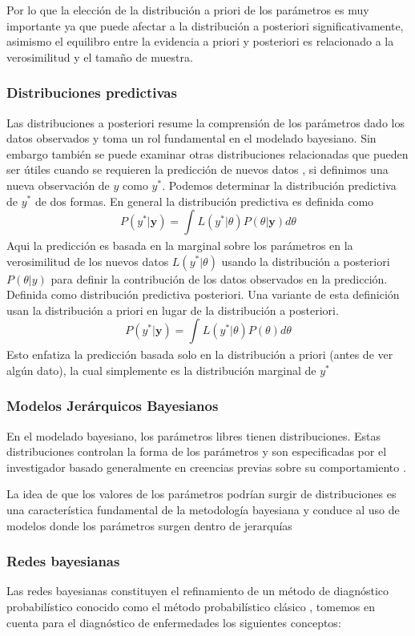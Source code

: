 Por lo que la elección de la distribución a priori de los parámetros es muy importante ya que puede afectar a la distribución a posteriori significativamente, asimismo el equilibro entre la evidencia a priori y posteriori es relacionado a la verosimilitud y el tamaño de muestra.

\subsubsection{Distribuciones predictivas}
Las distribuciones a posteriori resume la comprensión de los parámetros dado los datos observados y toma un rol fundamental en el modelado bayesiano. Sin embargo también se puede examinar otras distribuciones relacionadas que pueden ser útiles cuando se requieren la predicción de nuevos datos \cite{lawson2018bayesian}, si definimos una nueva observación de $y$ como $y^*$. Podemos determinar la distribución predictiva de $y^*$ de dos formas. En general la distribución predictiva es definida como
$$
P(y^* | \mathbf{y}) = \int_{}^{} L(y^* | \theta)P(\theta | \mathbf{y})d\theta
$$
Aqui la predicción es basada en la marginal sobre los parámetros en la verosimilitud de los nuevos datos $L(y^* | \theta)$ usando la distribución a posteriori $P(\theta | y)$ para definir la contribución de los datos observados en la predicción. Definida como distribución predictiva posteriori. Una variante de esta definición usan la distribución a priori en lugar de la distribución a posteriori.
$$
P(y^* | \mathbf{y}) = \int_{}^{} L(y^* | \theta)P(\theta)d\theta
$$
Esto enfatiza la predicción basada solo en la distribución a priori (antes de ver algún dato), la cual simplemente es la distribución marginal de $y^*$

\subsubsection{Modelos Jerárquicos Bayesianos}
En el modelado bayesiano, los parámetros libres tienen distribuciones. Estas distribuciones controlan la forma de los parámetros y son especificadas por el investigador basado generalmente en creencias previas sobre su comportamiento \cite{lawson2018bayesian}. 

La idea de que los valores de los parámetros podrían surgir de distribuciones es una característica fundamental de la metodología bayesiana y conduce al uso de modelos donde los parámetros surgen dentro de jerarquías

\subsubsection{Redes bayesianas}
Las redes bayesianas constituyen el refinamiento de un método de diagnóstico probabilístico conocido como el método probabilístico clásico \cite{koski2011bayesian}, tomemos en cuenta para el diagnóstico de enfermedades los siguientes conceptos:

